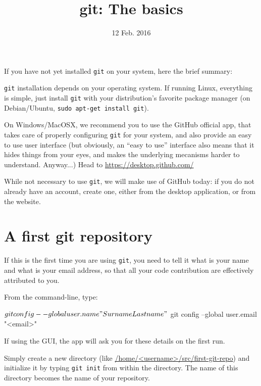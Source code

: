 \documentclass{instructions}
\title{git: The basics}
\date{12 Feb. 2016}
\newcommand{\git}{\texttt{git}\xspace}
\begin{document}
\maketitle

\intro

If you have not yet installed \git on your system, here the brief
summary:

\git installation depends on your operating system. If running Linux,
everything is simple, just install \git with your distribution's
favorite package manager (on Debian/Ubuntu,
\texttt{sudo apt-get install git}).

On Windows/MacOSX, we recommend you to use the GitHub official app, that takes
care of properly configuring \git for your system, and also provide an
easy to use user interface (but obviously, an ``easy to use'' interface also means
that it hides things from your eyes, and makes the underlying mecanisms harder to
understand. Anyway...) Head to \url{https://desktop.github.com/}


While not necessary to use \git, we will make use of GitHub today: if you do not
already have an account, create one, either from the desktop application, or
from the website.

\part{A first git repository}


If this is the first time you are using \git, you need to tell it what is your
name and what is your email address, so that all your code contribution are
effectively attributed to you.

From the command-line, type:


\begin{shcode}
$ git config --global user.name "Surname Lastname"
$ git config --global user.email "<email>"
\end{shcode}

If using the GUI, the app will ask you for these details on the first run.


Simply create a new directory (like \url{/home/<username>/src/first-git-repo}) and initialize
it by typing \texttt{git init} from within the directory. The name of this
directory becomes the name of your repository.
\end{document}
